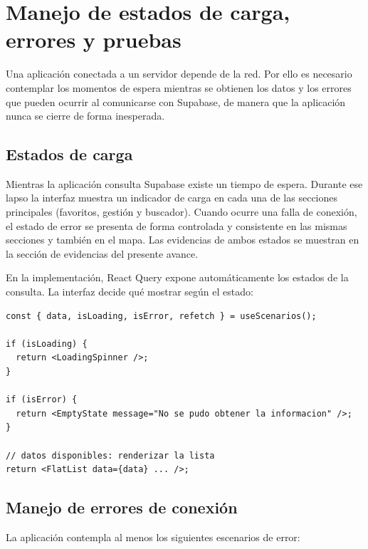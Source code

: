 
\section{Manejo de estados de carga, errores y pruebas}

Una aplicaci\'on conectada a un servidor depende de la red. Por ello es
necesario contemplar los momentos de espera mientras se obtienen los
datos y los errores que pueden ocurrir al comunicarse con Supabase,
de manera que la aplicaci\'on nunca se cierre de forma inesperada.

\subsection{Estados de carga}

Mientras la aplicaci\'on consulta Supabase existe un tiempo de espera.
Durante ese lapso la interfaz muestra un indicador de carga en cada una
de las secciones principales (favoritos, gesti\'on y buscador). Cuando
ocurre una falla de conexi\'on, el estado de error se presenta de forma
controlada y consistente en las mismas secciones y tambi\'en en el mapa.
Las evidencias de ambos estados se muestran en la secci\'on de
evidencias del presente avance.

En la implementaci\'on, React Query expone autom\'aticamente los estados
de la consulta. La interfaz decide qu\'e mostrar seg\'un el estado:

\begin{lstlisting}
const { data, isLoading, isError, refetch } = useScenarios();

if (isLoading) {
  return <LoadingSpinner />;
}

if (isError) {
  return <EmptyState message="No se pudo obtener la informacion" />;
}

// datos disponibles: renderizar la lista
return <FlatList data={data} ... />;
\end{lstlisting}

\subsection{Manejo de errores de conexi\'on}

La aplicaci\'on contempla al menos los siguientes escenarios de error:

